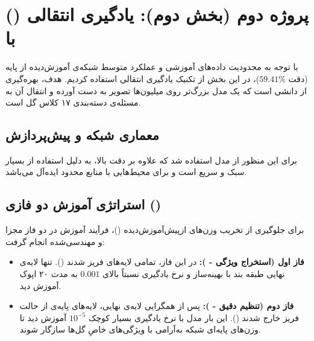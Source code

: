 \section{پروژه دوم (بخش دوم): یادگیری انتقالی () با }
با توجه به محدودیت داده‌های آموزشی و عملکرد متوسط شبکه‌ی آموزش‌دیده از پایه (دقت $59.41\%$)، در این بخش از تکنیک یادگیری انتقالی استفاده کردیم. هدف، بهره‌گیری از دانشی است که یک مدل بزرگ‌تر روی میلیون‌ها تصویر به دست آورده و انتقال آن به مسئله‌ی دسته‌بندی ۱۷ کلاس گل است.

\vspace{0.4cm}
\subsection{معماری شبکه و پیش‌پردازش}

برای این منظور از مدل  استفاده شد که علاوه بر دقت بالا، به دلیل استفاده از  بسیار سبک و سریع است و برای محیط‌هایی با منابع محدود ایده‌آل می‌باشد.

\begin{stepbox}
\end{stepbox}

\vspace{0.4cm}
\subsection{استراتژی آموزش دو فازی ()}

برای جلوگیری از تخریب وزن‌های ازپیش‌آموزش‌دیده ()، فرآیند آموزش در دو فاز مجزا و مهندسی‌شده انجام گرفت:

\begin{itemize}
    \item \textbf{فاز اول (استخراج ویژگی - ):} در این فاز، تمامی لایه‌های  فریز شدند (). تنها لایه‌ی نهایی طبقه بند با بهینه‌ساز  و نرخ یادگیری نسبتاً بالای $0.001$ به مدت ۲۰ اپوک آموزش دید. 
    \item \textbf{فاز دوم (تنظیم دقیق - ):} پس از همگرایی لایه‌ی نهایی، لایه‌های پایه‌ی  از حالت فریز خارج شدند (). این بار مدل با نرخ یادگیری بسیار کوچک $10^{-5}$ آموزش دید تا وزن‌های پایه‌ای شبکه به‌آرامی با ویژگی‌های خاصِ گل‌ها سازگار شوند.
\end{itemize}

